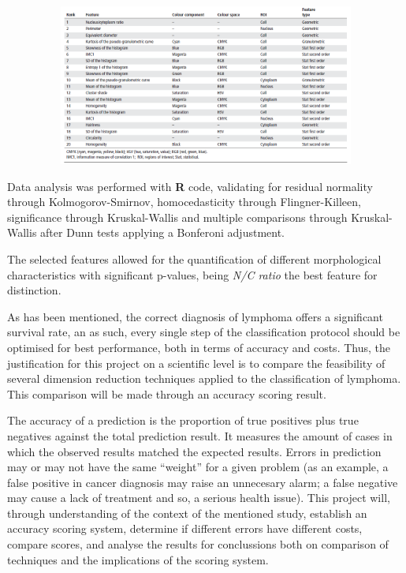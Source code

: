 \documentclass[]{article}
\let\origfigure\figure
\let\endorigfigure\endfigure
\renewenvironment{figure}[1][2] {
    \expandafter\origfigure\expandafter[H]
} {
    \endorigfigure
}
\begin{document}
\begin{figure}[h]

{\centering \includegraphics[width=6in,height=200px,]{./images/5-relevant-features} 

}

\caption{20 most relevant, less redundant features selected (Source: Puigví et al.)}\label{Fig. relevant_features}
\end{figure}

Data analysis was performed with \textbf{R} code, validating for
residual normality through Kolmogorov-Smirnov, homocedasticity through
Flingner-Killeen, significance through Kruskal-Wallis and multiple
comparisons through Kruskal-Wallis after Dunn tests applying a Bonferoni
adjustment.

The selected features allowed for the quantification of different
morphological characteristics with significant p-values, being \emph{N/C
ratio} the best feature for distinction.

As has been mentioned, the correct diagnosis of lymphoma offers a
significant survival rate, an as such, every single step of the
classification protocol should be optimised for best performance, both
in terms of accuracy and costs. Thus, the justification for this project
on a scientific level is to compare the feasibility of several dimension
reduction techniques applied to the classification of lymphoma. This
comparison will be made through an accuracy scoring result.

The accuracy of a prediction is the proportion of true positives plus
true negatives against the total prediction result. It measures the
amount of cases in which the observed results matched the expected
results. Errors in prediction may or may not have the same ``weight''
for a given problem (as an example, a false positive in cancer diagnosis
may raise an unnecesary alarm; a false negative may cause a lack of
treatment and so, a serious health issue). This project will, through
understanding of the context of the mentioned study, establish an
accuracy scoring system, determine if different errors have different
costs, compare scores, and analyse the results for conclussions both on
comparison of techniques and the implications of the scoring system.
\end{document}
